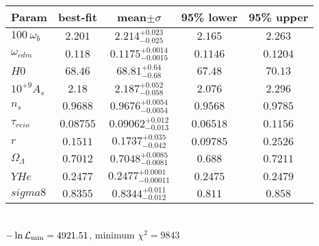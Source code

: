\begin{tabular}{|l|c|c|c|c|} 
 \hline 
Param & best-fit & mean$\pm\sigma$ & 95\% lower & 95\% upper \\ \hline 
$100~\omega_{b }$ &$2.201$ & $2.214_{-0.025}^{+0.023}$ & $2.165$ & $2.263$ \\ 
$\omega_{cdm }$ &$0.118$ & $0.1175_{-0.0015}^{+0.0014}$ & $0.1146$ & $0.1204$ \\ 
$H0$ &$68.46$ & $68.81_{-0.68}^{+0.64}$ & $67.48$ & $70.13$ \\ 
$10^{+9}A_{s }$ &$2.18$ & $2.187_{-0.058}^{+0.052}$ & $2.076$ & $2.296$ \\ 
$n_{s }$ &$0.9688$ & $0.9676_{-0.0054}^{+0.0054}$ & $0.9568$ & $0.9785$ \\ 
$\tau_{reio }$ &$0.08755$ & $0.09062_{-0.013}^{+0.012}$ & $0.06518$ & $0.1156$ \\ 
$r$ &$0.1511$ & $0.1737_{-0.042}^{+0.035}$ & $0.09785$ & $0.2526$ \\ 
$\Omega_{\Lambda }$ &$0.7012$ & $0.7048_{-0.0081}^{+0.0085}$ & $0.688$ & $0.7211$ \\ 
$YHe$ &$0.2477$ & $0.2477_{-0.00011}^{+0.0001}$ & $0.2475$ & $0.2479$ \\ 
$sigma8$ &$0.8355$ & $0.8344_{-0.012}^{+0.011}$ & $0.811$ & $0.858$ \\ 
\hline 
 \end{tabular} \\ 
$-\ln{\cal L}_\mathrm{min} =4921.51$, minimum $\chi^2=9843$ \\ 
